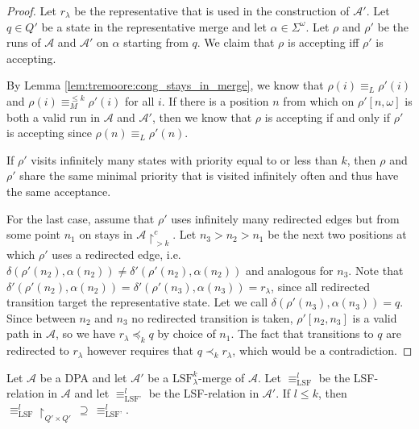 \begin{proof}
	Let $r_\lambda$ be the representative that is used in the construction of $\mathcal{A}'$. Let $q \in Q'$ be a state in the representative merge and let $\alpha \in \Sigma^\omega$. Let $\rho$ and $\rho'$ be the runs of $\mathcal{A}$ and $\mathcal{A}'$ on $\alpha$ starting from $q$. We claim that $\rho$ is accepting iff $\rho'$ is accepting.
	
	By Lemma \ref{lem:tremoore:cong_stays_in_merge}, we know that $\rho(i) \equiv_L \rho'(i)$ and $\rho(i) \equiv_M^{\leq k} \rho'(i)$ for all $i$. If there is a position $n$ from which on $\rho'[n,\omega]$ is both a valid run in $\mathcal{A}$ and $\mathcal{A}'$, then we know that $\rho$ is accepting if and only if $\rho'$ is accepting since $\rho(n) \equiv_L \rho'(n)$.
	
	If $\rho'$ visits infinitely many states with priority equal to or less than $k$, then $\rho$ and $\rho'$ share the same minimal priority that is visited infinitely often and thus have the same acceptance.
	
	For the last case, assume that $\rho'$ uses infinitely many redirected edges but from some point $n_1$ on stays in $\mathcal{A}\upharpoonright^c_{>k}$. Let $n_3 > n_2 > n_1$ be the next two positions at which $\rho'$ uses a redirected edge, i.e. $\delta(\rho'(n_2), \alpha(n_2)) \neq \delta'(\rho'(n_2), \alpha(n_2))$ and analogous for $n_3$. Note that $\delta'(\rho'(n_2), \alpha(n_2)) = \delta'(\rho'(n_3), \alpha(n_3)) = r_\lambda$, since all redirected transition target the representative state. Let we call $\delta(\rho'(n_3), \alpha(n_3)) = q$. Since between $n_2$ and $n_3$ no redirected transition is taken, $\rho'[n_2, n_3]$ is a valid path in $\mathcal{A}$, so we have $r_\lambda \preceq_k q$ by choice of $n_1$. The fact that transitions to $q$ are redirected to $r_\lambda$ however requires that $q \prec_k r_\lambda$, which would be a contradiction.
\end{proof}


\begin{lem}
	Let $\mathcal{A}$ be a DPA and let $\mathcal{A}'$ be a $\text{LSF}_\lambda^k$-merge of $\mathcal{A}$. Let $\equiv_\text{LSF}^l$ be the LSF-relation in $\mathcal{A}$ and let $\equiv_\text{LSF'}^l$ be the LSF-relation in $\mathcal{A}'$. If $l \leq k$, then $\equiv_\text{LSF}^l \upharpoonright_{Q' \times Q'} \,\supseteq\, \equiv_\text{LSF'}^l$.
	\label{lem:lsf:constr_does_not_change_lower_k}
\end{lem}

